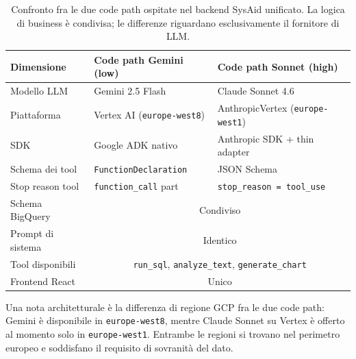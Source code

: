 \begin{table}[htbp]
  \centering
  \caption[Code path nel backend SysAid unificato]{Confronto fra le due
    code path ospitate nel backend SysAid unificato. La logica di business
    è condivisa; le differenze riguardano esclusivamente il fornitore di LLM.}
  \label{tab:sysaid-confronto}
  \begin{tabular}{lll}
    \toprule
    \textbf{Dimensione}      & \textbf{Code path Gemini (low)} & \textbf{Code path Sonnet (high)}  \\
    \midrule
    Modello LLM              & Gemini 2.5 Flash                & Claude Sonnet 4.6                 \\
    Piattaforma              & Vertex AI (\texttt{europe-west8}) & AnthropicVertex (\texttt{europe-west1}) \\
    SDK                      & Google ADK nativo               & Anthropic SDK + thin adapter      \\
    Schema dei tool          & \texttt{FunctionDeclaration}    & JSON Schema                       \\
    Stop reason tool         & \texttt{function\_call} part    & \texttt{stop\_reason = tool\_use} \\
    Schema BigQuery          & \multicolumn{2}{c}{Condiviso}                                      \\
    Prompt di sistema        & \multicolumn{2}{c}{Identico}                                       \\
    Tool disponibili         & \multicolumn{2}{c}{\texttt{run\_sql}, \texttt{analyze\_text}\footnotemark, \texttt{generate\_chart}} \\
    Frontend React           & \multicolumn{2}{c}{Unico}                                          \\
    \bottomrule
  \end{tabular}
\end{table}

Una nota architetturale è la differenza di regione GCP fra le
due code path: Gemini è disponibile in \texttt{europe-west8}, mentre
Claude Sonnet su Vertex è offerto al momento solo in
\texttt{europe-west1}. Entrambe le regioni si trovano nel perimetro
europeo e soddisfano il requisito di sovranità del dato.


